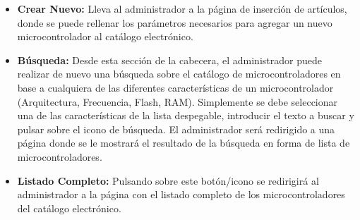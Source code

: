 \begin{itemize}
	\item \textbf{Crear Nuevo:} Lleva al administrador a la página de inserción de artículos, donde se puede rellenar los parámetros necesarios para agregar un nuevo microcontrolador al catálogo electrónico.

	\item \textbf{Búsqueda:} Desde esta sección de la cabecera, el administrador puede realizar de nuevo una búsqueda sobre el catálogo de microcontroladores en base a cualquiera de las diferentes características de un microcontrolador (Arquitectura, Frecuencia, Flash, RAM). Simplemente se debe seleccionar una de las características de la lista despegable, introducir el texto a buscar y pulsar sobre el icono de búsqueda.
	El administrador será redirigido a una página donde se le mostrará el resultado de la búsqueda en forma de lista de microcontroladores.
			
	\item \textbf{Listado Completo:} Pulsando sobre este botón/icono se redirigirá al administrador a la página con el listado completo de los microcontroladores del catálogo electrónico.
\end{itemize}